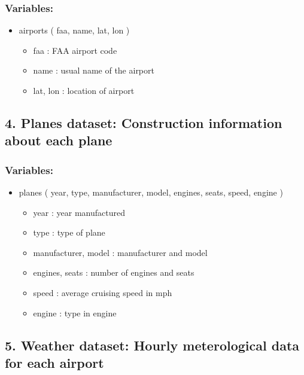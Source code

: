 \documentclass[
]{article}
\providecommand{\tightlist}{%
  \setlength{\itemsep}{0pt}\setlength{\parskip}{0pt}}
\begin{document}
\subsubsection{Variables:}\label{variables-2}

\begin{itemize}
\tightlist
\item
  airports ( faa, name, lat, lon )

  \begin{itemize}
  \tightlist
  \item
    faa : FAA airport code
  \item
    name : usual name of the airport
  \item
    lat, lon : location of airport
  \end{itemize}
\end{itemize}

\subsection{4. Planes dataset: Construction information about each
plane}\label{planes-dataset-construction-information-about-each-plane}

\subsubsection{Variables:}\label{variables-3}

\begin{itemize}
\tightlist
\item
  planes ( year, type, manufacturer, model, engines, seats, speed,
  engine )

  \begin{itemize}
  \tightlist
  \item
    year : year manufactured
  \item
    type : type of plane
  \item
    manufacturer, model : manufacturer and model
  \item
    engines, seats : number of engines and seats
  \item
    speed : average cruising speed in mph
  \item
    engine : type in engine
  \end{itemize}
\end{itemize}

\subsection{5. Weather dataset: Hourly meterological data for each
airport}\label{weather-dataset-hourly-meterological-data-for-each-airport}
\end{document}
